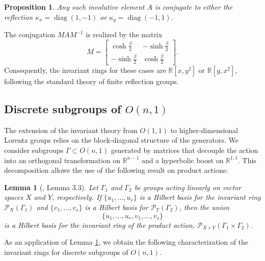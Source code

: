 \documentclass[]{article}
\newtheorem{proposition}[theorem]{Proposition}
\newtheorem{lemma}[theorem]{Lemma}
\begin{document}
\begin{proposition}
	Any such involutive element $A$ is conjugate to either the reflection $\kappa_x = \operatorname{diag}(1, -1)$ or $\kappa_y = \operatorname{diag}(-1, 1)$. 
\end{proposition}
The conjugation $M A M^{-1}$ is realized by the matrix$$M = \begin{bmatrix} \cosh \tfrac{\beta}{2} & -\sinh \tfrac{\beta}{2} \\ -\sinh \tfrac{\beta}{2} & \cosh \tfrac{\beta}{2} \end{bmatrix}.$$Consequently, the invariant rings for these cases are $\mathbb{R}[x, y^2]$ or $\mathbb{R}[y, x^2]$, following the standard theory of finite reflection groups.


\subsection{Discrete subgroups of $O(n,1)$}

The extension of the invariant theory from $O(1,1)$ to higher-dimensional Lorentz groups relies on the block-diagonal structure of the generators. We consider subgroups $\Gamma \subset O(n,1)$ generated by matrices that decouple the action into an orthogonal transformation on $\mathbb{R}^{n-1}$ and a hyperbolic boost on $\mathbb{R}^{1,1}$. This decomposition allows the use of the following result on product actions:

\begin{lemma}[\cite{baptistelli2016}, Lemma 3.3]\label{lemma3_3}
	Let $\Gamma_1$ and $\Gamma_2$ be groups acting linearly on vector spaces $X$ and $Y$, respectively. If $\{u_1, \dots, u_r\}$ is a Hilbert basis for the invariant ring $\mathcal{P}_X(\Gamma_1)$ and $\{v_1, \dots, v_s\}$ is a Hilbert basis for $\mathcal{P}_Y(\Gamma_2)$, then the union
	$$\{u_1, \dots, u_r, v_1, \dots, v_s\}$$
	is a Hilbert basis for the invariant ring of the product action, $\mathcal{P}_{X \times Y}(\Gamma_1 \times \Gamma_2)$.
\end{lemma}

As an application of Lemma \ref{lemma3_3}, we obtain the following characterization of the invariant rings for discrete subgroups of $O(n,1)$.
\end{document}
